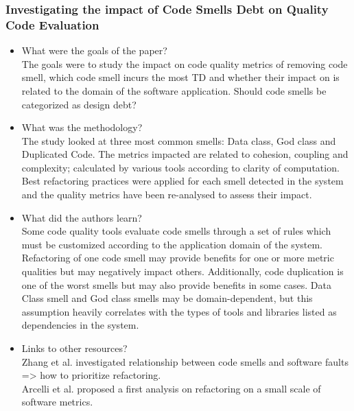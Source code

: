\documentclass{mprop}
\begin{document}
\subsubsection{Investigating the impact of Code Smells Debt on Quality Code Evaluation} \cite{Fontana2012}
\begin{itemize}
	\item What were the goals of the paper? \\
	      The goals were to study the impact on code quality metrics of removing code smell, which code smell incurs the most TD and whether their impact on is related to the domain of the software application.
	      Should code smells be categorized as design debt?
	\item What was the methodology? \\
	      The study looked at three most common smells: Data class, God class and Duplicated Code.
	      The metrics impacted are related to cohesion, coupling and complexity; calculated by various tools according to clarity of computation.
	      Best refactoring practices were applied for each smell detected in the system and the quality metrics have been re-analysed to assess their impact.
	\item What did the authors learn? \\
	      Some code quality tools evaluate code smells through a set of rules which must be customized according to the application domain of the system.
	      Refactoring of one code smell may provide benefits for one or more metric qualities but may negatively impact others.
	      Additionally, code duplication is one of the worst smells but may also provide benefits in some cases.
	      Data Class smell and God class smells may be domain-dependent, but this assumption heavily correlates with the types of tools and libraries listed as dependencies in the system.
	\item Links to other resources? \\
	      Zhang et al. investigated relationship between code smells and software faults => how to prioritize refactoring.\\
	      Arcelli et al. proposed a first analysis on refactoring on a small scale of software metrics.
\end{itemize}
\end{document}
